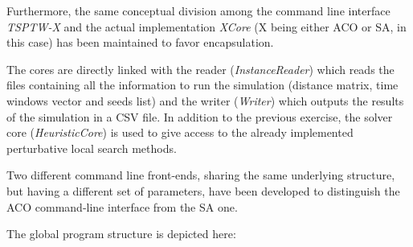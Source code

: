 \documentclass{article}
\newcommand{\component}[2]{node (p#1) [component]
  {{\scriptsize\textit{#2}}}}
\newcommand{\backgroundSquare}[5]{%
  \begin{pgfonlayer}{background}
    \path (#1.west |- #2.north)+(-0.5,0.5) node (a1) {};
    \path (#3.east |- #4.south)+(+0.5,-0.25) node (a2) {};
    \path[fill=blue!20,rounded corners, draw=black!50, dashed]
      (a1) rectangle (a2);
    \path (a1.east |- a1.south)+(0.8,-0.3) node (u1)[texto]
      {\scriptsize\textit{#5 Tier}};
  \end{pgfonlayer}}
\begin{document}
Furthermore, the same conceptual division among the command line interface \emph{TSPTW-X} and the actual implementation \emph{XCore} (X being either ACO or SA, in this case) has been maintained to favor encapsulation.

The cores are directly linked with the reader (\emph{InstanceReader}) which reads the files containing all the information to run the simulation (distance matrix, time windows vector and seeds list) and the writer (\emph{Writer}) which outputs the results of the simulation in a CSV file.
In addition to the previous exercise, the solver core (\emph{HeuristicCore}) is used to give access to the already implemented perturbative local search methods.

Two different command line front-ends, sharing the same underlying structure, but having a different set of parameters, have been developed to distinguish the ACO command-line interface from the SA one. 

The global program structure is depicted here:

\begin{center}
\end{center}
\end{document}
